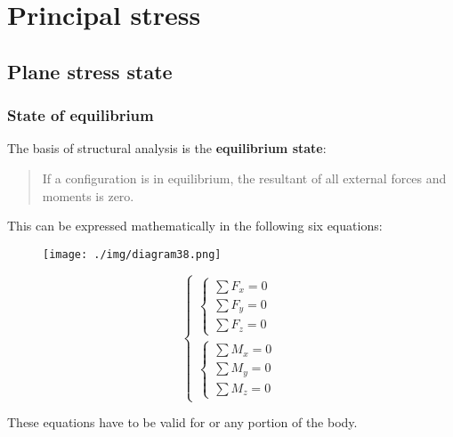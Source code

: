 \chapter{Principal stress}
\section{Plane stress state}
\subsection{State of equilibrium}
The basis of structural analysis is the \textbf{equilibrium state}:
\begin{quotation}
  If a configuration is in equilibrium, the resultant of all external forces and moments is zero.
\end{quotation}
This can be expressed mathematically in the following six equations:
\hfill \break
\begin{minipage}{0.5\textwidth}
  \begin{figure}[H]
    \centering
    \texttt{[image: ./img/diagram38.png]}
    \caption{}
  \end{figure}
\end{minipage}
\begin{minipage}{0.45\textwidth}
  \begin{equation}
    \begin{cases}
      \begin{cases}
        \sum F_x = 0 \\
        \sum F_y = 0 \\
        \sum F_z = 0
      \end{cases} \\
      \begin{cases}
        \sum M_x = 0 \\
        \sum M_y = 0 \\
        \sum M_z = 0
      \end{cases}
    \end{cases}
  \end{equation}
\end{minipage}
\hfill \break
These equations have to be valid for or any portion of the body.
